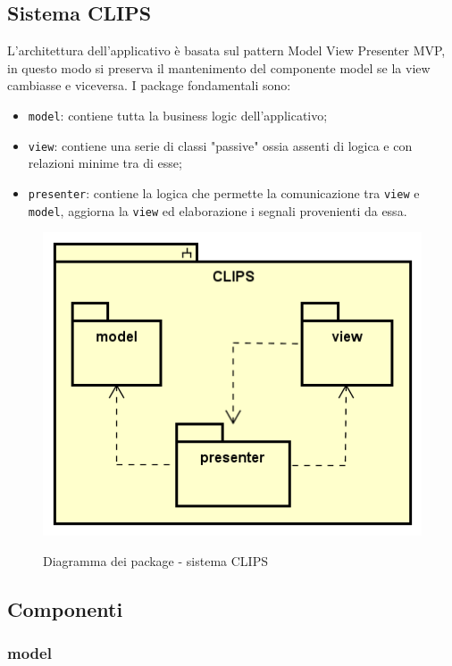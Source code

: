 \documentclass[../DefinizioneDiProdotto.tex]{subfiles}
\begin{document}
	\subsection{Sistema CLIPS}
		L'architettura dell'applicativo è basata sul pattern Model View Presenter MVP, in questo modo si preserva il mantenimento del componente model se la view cambiasse e viceversa. I package fondamentali sono:
		\begin{itemize}
			\item \verb|model|: contiene tutta la business logic dell'applicativo;
			\item \verb|view|: contiene una serie di classi "passive" ossia assenti di logica e con relazioni minime tra di esse;
			\item \verb|presenter|: contiene la logica che permette la comunicazione tra \verb|view| e \verb|model|, aggiorna la \verb|view| ed elaborazione i segnali provenienti da essa.
		\end{itemize}
		
		\begin{figure} [h]
			\centering
			\includegraphics[scale=0.8]{img/package/CLIPS}
			\label{CLIPS}
			\caption{Diagramma dei package - sistema CLIPS}
		\end{figure}
		
	
	\subsection{Componenti}

\subsubsection{model}
\end{document}
